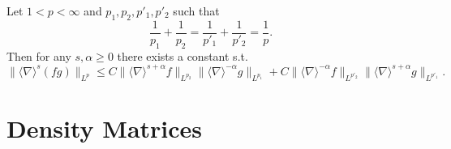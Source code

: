 \begin{lem}
  \label{lem:fracleib} Let $1 < p < \infty$ and $p_1, p_2, p'_1, p'_2$ such
  that
  \[ \frac{1}{p_1} + \frac{1}{p_2} = \frac{1}{p'_1} + \frac{1}{p'_2} =
     \frac{1}{p} . \]
  Then for any $s, \alpha \geqslant 0$ there exists a constant s.t.
  \[ \| \langle \nabla \rangle^s (f g) \|_{L^p} \leqslant C \| \langle \nabla
     \rangle^{s + \alpha} f \|_{L^{p_2}} \| \langle \nabla \rangle^{- \alpha}
     g \|_{L^{p_1}} + C \| \langle \nabla \rangle^{- \alpha} f \|_{L^{p'_2}}
     \| \langle \nabla \rangle^{s + \alpha} g \|_{L^{p'_1}} . \]
\end{lem}

\section*{Density Matrices}

